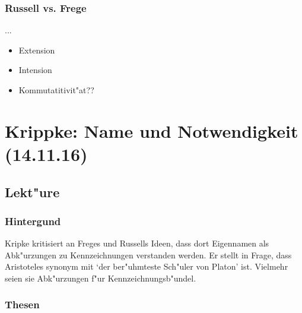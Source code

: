 \documentclass[emulatestandardclasses]{scrartcl}
\begin{document}
\subsubsection{Russell vs. Frege}

...

\begin{itemize}
  \item Extension
  \item Intension
  \item Kommutatitivit"at??
\end{itemize}

\section{Krippke: Name und Notwendigkeit\\(14.11.16)}

\subsection{Lekt"ure}

\subsubsection{Hintergund}

Kripke kritisiert an Freges und Russells Ideen, dass dort Eigennamen als Abk"urzungen zu Kennzeichnungen verstanden werden. Er stellt in Frage, dass Aristoteles synonym mit `der ber"uhmteste Sch"uler von Platon' ist. Vielmehr seien sie Abk"urzungen f"ur Kennzeichnungsb"undel.

\subsubsection{Thesen}
\end{document}
